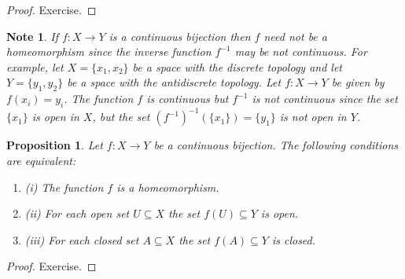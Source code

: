 \documentclass[11pt, letterpaper, oneside]{report}
\theoremstyle{pplain}
\newtheorem{proposition}[theorem]{Proposition}
\newtheorem{ITERMVALUE THM}[theorem]{Intermediate Value Theorem}
\newtheorem{HEINEBOREL THM}[theorem]{Heine-Borel Theorem}
\newtheorem{UMETR THM}[theorem]{Urysohn Metrization Theorem}
\newtheorem{UMETR2 THM}[theorem]{Urysohn Metrization Theorem (v.2)}
\theoremstyle{ddefinition}
\newtheorem{note}[theorem]{Note}
\theoremstyle{nnn}
\newtheorem{TDA NN}[theorem]{Topological Data Analysis. }
\theoremstyle{eexercise}
\newcommand{\benu}{\begin{enumerate}}
\newcommand{\eenu}{\end{enumerate}}
\begin{document}
\begin{proof}
Exercise. 
\end{proof}


\begin{note}
\label{CONT BIJ NOTE}
If $f\colon X\to Y$ is a continuous bijection then $f$ need not be a homeomorphism since the 
inverse function $f^{-1}$ may be not continuous. For example, let $X= \{x_{1}, x_{2}\}$ be a space 
with the discrete topology and let $Y= \{y_{1}, y_{2}\}$ be a space 
with the antidiscrete topology.  Let $f\colon X\to Y$  be given by $f(x_{i}) = y_{i}$. 
The function $f$ is continuous  but $f^{-1}$ is not continuous since the set $\{x_{1}\}$ is open in $X$, 
but the set $(f^{-1})^{-1}(\{x_{1}\}) = \{y_{1}\}$ is not open in $Y$. 
\end{note}


\begin{proposition}
\label{HOMEO OPEN PROP}
Let $f\colon X\to Y$ be a continuous bijection. The following conditions are equivalent:
\benu
\item[(i)] The function $f$ is a homeomorphism. 
\item[(ii)] For each open set $U\subseteq X$ the set $f(U)\subseteq Y$ is open. 
\item[(iii)] For each closed set $A\subseteq X$ the set $f(A)\subseteq Y$ is closed.   
\eenu
\end{proposition}

\begin{proof}
Exercise. 
\end{proof}
\end{document}
